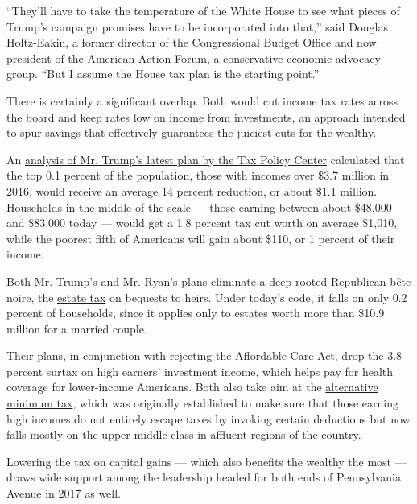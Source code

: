 ``They'll have to take the temperature of the White House to see what
pieces of Trump's campaign promises have to be incorporated into that,''
said Douglas Holtz-Eakin, a former director of the Congressional Budget
Office and now president of the
\href{https://www.americanactionforum.org/}{American Action Forum}, a
conservative economic advocacy group. ``But I assume the House tax plan
is the starting point.''

There is certainly a significant overlap. Both would cut income tax
rates across the board and keep rates low on income from investments, an
approach intended to spur savings that effectively guarantees the
juiciest cuts for the wealthy.

An
\href{http://www.taxpolicycenter.org/publications/analysis-donald-trumps-revised-tax-plan/full}{analysis
of Mr. Trump's latest plan by the Tax Policy Center} calculated that the
top 0.1 percent of the population, those with incomes over \$3.7 million
in 2016, would receive an average 14 percent reduction, or about \$1.1
million. Households in the middle of the scale --- those earning between
about \$48,000 and \$83,000 today --- would get a 1.8 percent tax cut
worth on average \$1,010, while the poorest fifth of Americans will gain
about \$110, or 1 percent of their income.

Both Mr. Trump's and Mr. Ryan's plans eliminate a deep-rooted Republican
bête noire, the
\href{http://topics.nytimes.com/your-money/planning/estate-planning/index.html?inline=nyt-classifier}{estate
tax} on bequests to heirs. Under today's code, it falls on only 0.2
percent of households, since it applies only to estates worth more than
\$10.9 million for a married couple.

Their plans, in conjunction with rejecting the Affordable Care Act, drop
the 3.8 percent surtax on high earners' investment income, which helps
pay for health coverage for lower-income Americans. Both also take aim
at the
\href{http://topics.nytimes.com/top/reference/timestopics/subjects/a/alternative_minimum_tax/index.html?inline=nyt-classifier}{alternative
minimum tax}, which was originally established to make sure that those
earning high incomes do not entirely escape taxes by invoking certain
deductions but now falls mostly on the upper middle class in affluent
regions of the country.

Lowering the tax on capital gains --- which also benefits the wealthy
the most --- draws wide support among the leadership headed for both
ends of Pennsylvania Avenue in 2017 as well.

